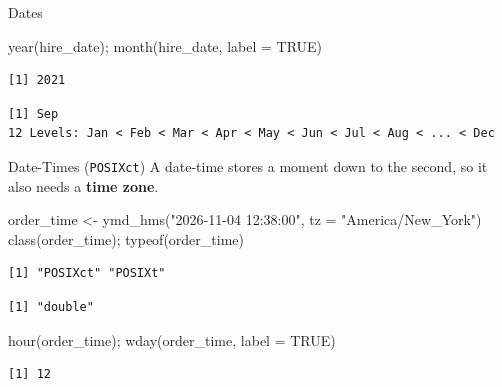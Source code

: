 \documentclass[
  ignorenonframetext,
  aspectratio=169,
]{beamer}
\newenvironment{Shaded}{\begin{snugshade}}{\end{snugshade}}
\newcommand{\AttributeTok}[1]{\textcolor[rgb]{0.40,0.45,0.13}{#1}}
\newcommand{\ConstantTok}[1]{\textcolor[rgb]{0.56,0.35,0.01}{#1}}
\newcommand{\FunctionTok}[1]{\textcolor[rgb]{0.28,0.35,0.67}{#1}}
\newcommand{\NormalTok}[1]{\textcolor[rgb]{0.00,0.23,0.31}{#1}}
\newcommand{\OtherTok}[1]{\textcolor[rgb]{0.00,0.23,0.31}{#1}}
\newcommand{\StringTok}[1]{\textcolor[rgb]{0.13,0.47,0.30}{#1}}
\begin{document}
\begin{frame}[fragile]{Dates}
\begin{Shaded}
\begin{Highlighting}[]
\FunctionTok{year}\NormalTok{(hire\_date); }\FunctionTok{month}\NormalTok{(hire\_date, }\AttributeTok{label =} \ConstantTok{TRUE}\NormalTok{)}
\end{Highlighting}
\end{Shaded}

\begin{verbatim}
[1] 2021
\end{verbatim}

\begin{verbatim}
[1] Sep
12 Levels: Jan < Feb < Mar < Apr < May < Jun < Jul < Aug < ... < Dec
\end{verbatim}
\end{frame}

\begin{frame}[fragile]{Date-Times (\texttt{POSIXct})}
\protect\hypertarget{date-times-posixct}{}
A date-time stores a moment down to the second, so it also needs a
\textbf{time zone}.

\begin{Shaded}
\begin{Highlighting}[]
\NormalTok{order\_time }\OtherTok{\textless{}{-}} \FunctionTok{ymd\_hms}\NormalTok{(}\StringTok{"2026{-}11{-}04 12:38:00"}\NormalTok{, }\AttributeTok{tz =} \StringTok{"America/New\_York"}\NormalTok{)}
\FunctionTok{class}\NormalTok{(order\_time); }\FunctionTok{typeof}\NormalTok{(order\_time)}
\end{Highlighting}
\end{Shaded}

\begin{verbatim}
[1] "POSIXct" "POSIXt" 
\end{verbatim}

\begin{verbatim}
[1] "double"
\end{verbatim}

\begin{Shaded}
\begin{Highlighting}[]
\FunctionTok{hour}\NormalTok{(order\_time); }\FunctionTok{wday}\NormalTok{(order\_time, }\AttributeTok{label =} \ConstantTok{TRUE}\NormalTok{)}
\end{Highlighting}
\end{Shaded}

\begin{verbatim}
[1] 12
\end{verbatim}


\end{frame}
\end{document}
